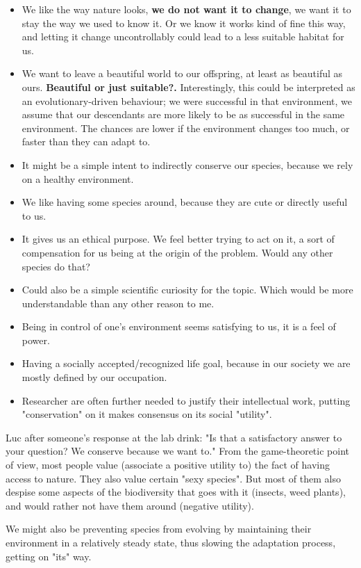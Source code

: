 \documentclass[12pt]{article}
\begin{document}
\begin{itemize}
    \item We like the way nature looks, \textbf{we do not want it to change}, we want it to stay the way we used to know it. Or we know it works kind of fine this way, and letting it change uncontrollably could lead to a less suitable habitat for us.
    \item We want to leave a beautiful world to our offspring, at least as beautiful as ours. \textbf{Beautiful or just suitable?.} Interestingly, this could be interpreted as an evolutionary-driven behaviour; we were successful in that environment, we assume that our descendants are more likely to be as successful in the same environment. The chances are lower if the environment changes too much, or faster than they can adapt to.
    \item It might be a simple intent to indirectly conserve our species, because we rely on a healthy environment.
    \item We like having some species around, because they are cute or directly useful to us.
    \item It gives us an ethical purpose. We feel better trying to act on it, a sort of compensation for us being at the origin of the problem. Would any other species do that?
    \item Could also be a simple scientific curiosity for the topic. Which would be more understandable than any other reason to me.
    \item Being in control of one's environment seems satisfying to us, it is a feel of power.
    \item Having a socially accepted/recognized life goal, because in our society we are mostly defined by our occupation.
    \item Researcher are often further needed to justify their intellectual work, putting "conservation" on it makes consensus on its social "utility".
\end{itemize}

Luc after someone's response at the lab drink: "Is that a satisfactory answer to your question? We conserve because we want to."
From the game-theoretic point of view, most people value (associate a positive utility to) the fact of having access to nature. They also value certain "sexy species".
But most of them also despise some aspects of the biodiversity that goes with it (insects, weed plants), and would rather not have them around (negative utility).

We might also be preventing species from evolving by maintaining their environment in a relatively steady state, thus slowing the adaptation process, getting on "its" way.
\end{document}
